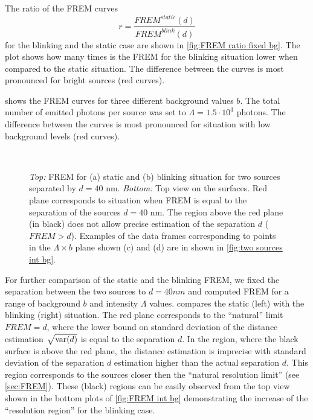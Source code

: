 The ratio of the FREM curves
%
\begin{equation}
	r=\frac{\unit{FREM}^{static}(d)}{\unit{FREM}^{blink}(d)}
	\label{eq:ratio}
\end{equation} 
%
for the blinking and the static case are shown in \autoref{fig:FREM ratio fixed bg}. The plot shows how many times is the FREM for the blinking situation lower when compared to the static situation. The difference between the curves is most pronounced for bright sources (red curves). 

 shows the FREM curves for three different background values $b$. The total number of emitted photons per source was set to $\Lambda =1.5\cdot 10^3$ photons. The difference between the curves is most pronounced for situation with low background levels (red curves). 

\clearpage
\begin{figure}[!b]
	\centering
	\newcommand{\wf}{.48\textwidth}
	\\
	\caption{{\it Top:} FREM for (a) static and (b) blinking situation for two sources separated by $d=40$ nm. {\it Bottom:} Top view on the surfaces. Red plane corresponds to situation when FREM is equal to the separation of the sources $d=40$ nm. The region above the red plane (in black) does not allow precise estimation of the separation $d$ ($\unit{FREM}>d$). Examples of the data frames corresponding to points in the $\Lambda \times b$ plane shown (c) and (d) are in shown in  \autoref{fig:two sources int bg}.}
	\label{fig:FREM int bg}
\end{figure}
%
For further comparison of the static and the blinking FREM, we fixed the separation between the two sources to $d=40\unit{nm}$ and computed FREM for a range of background $b$ and intensity  $\Lambda$ values.  compares the static (left) with the blinking (right) situation. The red plane corresponds to the ``natural'' limit $\unit{FREM}=d$, where the lower bound on standard deviation of the distance estimation $\sqrt{\mathrm{var}(d)}$ is equal to the separation $d$. In the region, where the black surface is above the red plane, the distance estimation is imprecise with standard deviation of the separation $d$ estimation higher than the actual separation $d$. This region corresponds to the sources closer then the ``natural resolution limit'' (see \autoref{sec:FREM}).  These (black) regions can be easily observed from the top view shown in the bottom plots of \autoref{fig:FREM int bg} demonstrating the increase of the ``resolution region'' for the blinking case.

